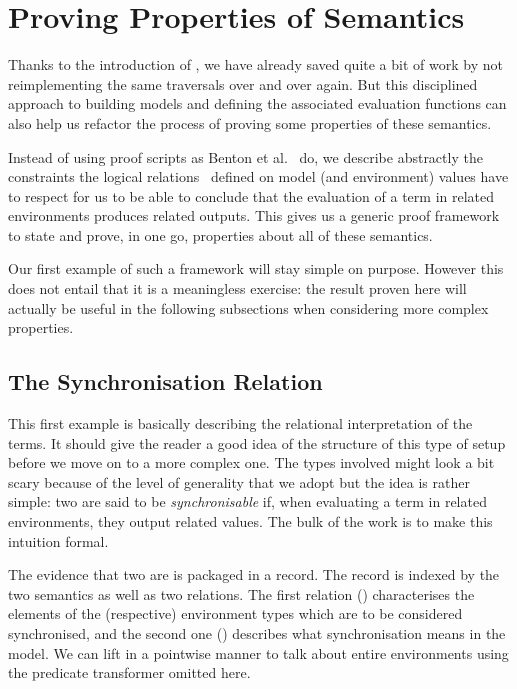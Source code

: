 

\section{Proving Properties of Semantics}
\label{properties}

Thanks to the introduction of , we have already saved
quite a bit of work by not reimplementing the same traversals over
and over again. But this disciplined approach to building models and
defining the associated evaluation functions can also help us refactor
the process of proving some properties of these semantics.

Instead of using proof scripts as Benton et al.~\cite{benton2012strongly}
do, we describe abstractly the constraints the logical relations~\cite{reynolds1983types}
defined on model (and environment) values have to respect for us to be
able to conclude that the evaluation of a term in related environments
produces related outputs. This gives us a generic proof framework to
state and prove, in one go, properties about all of these semantics.

Our first example of such a framework will stay simple on purpose.
However this does not entail that it is a meaningless exercise: the
result proven here will actually be useful in the following subsections
when considering more complex properties.

\subsection{The Synchronisation Relation}

This first example is basically describing the relational interpretation
of the terms. It should give the reader a good idea of the structure of
this type of setup before we move on to a more complex one. The types
involved might look a bit scary because of the level of generality that
we adopt but the idea is rather simple: two  are said to
be \emph{synchronisable} if, when evaluating a term in related environments,
they output related values. The bulk of the work is to make this intuition
formal.

The evidence that two  are  is
packaged in a record. The record is indexed by the two semantics
as well as two relations. The first relation ()
characterises the elements of the (respective) environment types
which are to be considered synchronised, and the second one ()
describes what synchronisation means in the model. We can lift
 in a pointwise manner to talk about entire environments
using the  predicate transformer omitted here.

